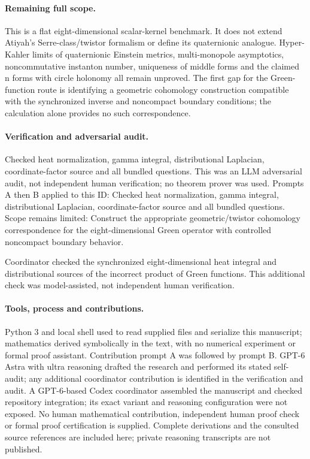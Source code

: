 \documentclass[11pt]{article}
\begin{document}
\paragraph{Remaining full scope.}This is a flat eight-dimensional scalar-kernel benchmark. It does not extend Atiyah's Serre-class/twistor formalism or define its quaternionic analogue. Hyper-Kahler limits of quaternionic Einstein metrics, multi-monopole asymptotics, noncommutative instanton number, uniqueness of middle forms and the claimed n forms with circle holonomy all remain unproved. The first gap for the Green-function route is identifying a geometric cohomology construction compatible with the synchronized inverse and noncompact boundary conditions; the calculation alone provides no such correspondence.

\paragraph{Verification and adversarial audit.}
Checked heat normalization, gamma integral, distributional Laplacian, coordinate-factor source and all bundled questions. This was an LLM adversarial audit, not independent human verification; no theorem prover was used. Prompts A then B applied to this ID: Checked heat normalization, gamma integral, distributional Laplacian, coordinate-factor source and all bundled questions. Scope remains limited: Construct the appropriate geometric/twistor cohomology correspondence for the eight-dimensional Green operator with controlled noncompact boundary behavior.

Coordinator checked the synchronized eight-dimensional heat integral and distributional sources of the incorrect product of Green functions. This additional check was model-assisted, not independent human verification.

\paragraph{Tools, process and contributions.}
Python 3 and local shell used to read supplied files and serialize this manuscript; mathematics derived symbolically in the text, with no numerical experiment or formal proof assistant. Contribution prompt A was followed by prompt B. GPT-6 Astra with ultra reasoning drafted the research and performed its stated self-audit; any additional coordinator contribution is identified in the verification and audit. A GPT-6-based Codex coordinator assembled the manuscript and checked repository integration; its exact variant and reasoning configuration were not exposed. No human mathematical contribution, independent human proof check or formal proof certification is supplied. Complete derivations and the consulted source references are included here; private reasoning transcripts are not published.
\end{document}
